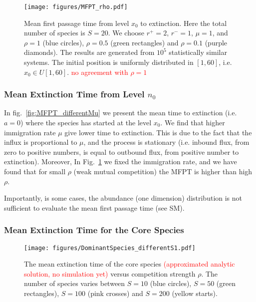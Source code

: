\documentclass[%
 amsmath,amssymb,
 reprint,%
]{revtex4-2}
\begin{document}
\begin{figure}
    \centering
    \texttt{[image: figures/MFPT\_rho.pdf]}
    \caption{Mean first passage time from level $x_0$ to extinction. Here the total number of species is $S=20$. We choose $r^+=2$, $r^-=1$,  $\mu=1$, and $\rho=1$ (blue circles), $\rho=0.5$ (green rectangles) and $\rho=0.1$ (purple diamonds). The results are generated from $10^5$ statistically similar systems. The initial position is uniformly distributed in $[1,60]$, i.e. $x_0\in U[1,60]$.  \textcolor{red}{no agreement with $\rho=1$}    }
    \label{fig:MFPT_rho}
\end{figure}

\subsubsection{Mean Extinction Time from  Level $n_0$}

In fig.~\ref{fig:MFPT_differentMu} we present the mean time to extinction (i.e. $a=0$) where the species has started at the level $x_0$. We find that higher immigration rate $\mu$ give lower time to extinction. This is due to the fact that the influx is proportional to $\mu$, and the process is stationary (i.e. inbound flux, from zero to positive numbers, is equal to outbound flux, from positive number to extinction). Moreover, In Fig.~\ref{fig:MFPT_rho} we fixed the immigration rate, and we have found that for small $\rho$ (weak mutual competition) the MFPT is higher than high $\rho$. 

Importantly, is some cases, the abundance (one  dimension) distribution is not sufficient to evaluate the mean first passage time (see SM). 

\subsubsection{Mean Extinction Time for the Core Species}

\begin{figure}
    \centering
    \texttt{[image: figures/DominantSpecies\_differentS1.pdf]}
    \caption{The mean extinction time of the core species \textcolor{red}{(approximated analytic solution, no simulation yet)} versus competition strength $\rho$.  The number of species varies between $S=10$ (blue circles), $S=50$ (green rectangles), $S=100$ (pink crosses) and $S=200$ (yellow starts).    }
    \label{fig:DeterminsticVsStochastic}
\end{figure}
\end{document}
